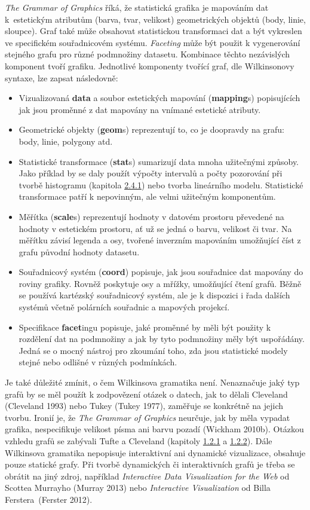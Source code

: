 \documentclass[12pt,]{article}
\providecommand{\tightlist}{%
  \setlength{\itemsep}{0pt}\setlength{\parskip}{0pt}}
\begin{document}
\qquad \textit{The Grammar of Graphics} říká, že statistická grafika je
mapováním dat k~estetickým atributům (barva, tvar, velikost)
geometrických objektů (body, linie, sloupce). Graf také může obsahovat
statistickou transformaci dat a být vykreslen ve specifickém
souřadnicovém systému. \emph{Faceting} může být použit k vygenerování
stejného grafu pro různé podmnožiny datasetu. Kombinace těchto
nezávislých komponent tvoří grafiku. Jednotlivé komponenty tvořící graf,
dle Wilkinsonovy syntaxe, lze zapsat následovně:

\begin{itemize}
\tightlist
\item
  Vizualizovaná \textbf{data} a soubor estetických mapování
  (\textbf{mapping}s) popisujících jak jsou proměnné z dat mapovány na
  vnímané estetické atributy.
\item
  Geometrické objekty (\textbf{geom}s) reprezentují to, co je doopravdy
  na grafu: body, linie, polygony atd.
\item
  Statistické transformace (\textbf{stat}s) sumarizují data mnoha
  užitečnými způsoby. Jako příklad by se daly použít výpočty intervalů a
  počty pozorování při tvorbě histogramu (kapitola
  \protect\hyperlink{hist}{2.4.1}) nebo tvorba lineárního modelu.
  Statistické transformace patří k nepovinným, ale velmi užitečným
  komponentům.
\item
  Měřítka (\textbf{scale}s) reprezentují hodnoty v datovém prostoru
  převedené na hodnoty v estetickém prostoru, ať už se jedná o barvu,
  velikost či tvar. Na měřítku závisí legenda a osy, tvořené inverzním
  mapováním umožňující číst z grafu původní hodnoty datasetu.
\item
  Souřadnicový systém (\textbf{coord}) popisuje, jak jsou souřadnice dat
  mapovány do roviny grafiky. Rovněž poskytuje osy a mřížky, umožňující
  čtení grafů. Běžně se používá kartézský souřadnicový systém, ale je k
  dispozici i řada dalších systémů včetně polárních souřadnic a mapových
  projekcí.
\item
  Specifikace \textbf{facet}ingu popisuje, jaké proměnné by měli být
  použity k rozdělení dat na podmnožiny a jak by tyto podmnožiny měly
  být uspořádány. Jedná se o mocný nástroj pro zkoumání toho, zda jsou
  statistické modely stejné nebo odlišné v různých podmínkách.
\end{itemize}

\qquad Je také důležité zmínit, o čem Wilkinsova gramatika není.
Nenaznačuje jaký typ grafů by se měl použít k zodpovězení otázek o
datech, jak to dělali Cleveland (Cleveland 1993) nebo Tukey (Tukey
1977), zaměřuje se konkrétně na jejich tvorbu. Ironií je, že
\textit{The Grammar of Graphics} neurčuje, jak by měla vypadat grafika,
nespecifikuje velikost písma ani barvu pozadí (Wickham 2010b). Otázkou
vzhledu grafů se zabývali Tufte a Cleveland (kapitoly
\protect\hyperlink{tufte}{1.2.1} a
\protect\hyperlink{cleveland}{1.2.2}). Dále Wilkinsova gramatika
nepopisuje interaktivní ani dynamické vizualizace, obsahuje pouze
statické grafy. Při tvorbě dynamických či interaktivních grafů je třeba
se obrátit na jiný zdroj, například \emph{Interactive Data Visualization
for the Web} od Scottea Murrayho (Murray 2013) nebo \emph{Interactive
Visualization} od Billa Ferstera~(Ferster 2012).
\end{document}

